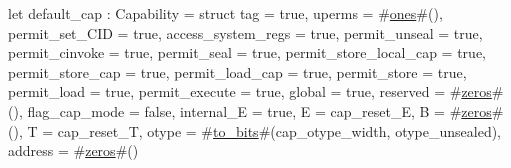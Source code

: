 let default_cap : Capability = struct {
  tag                    = true,
  uperms                 = #\hyperref[sailRISCVzones]{ones}#(),
  permit_set_CID         = true,
  access_system_regs     = true,
  permit_unseal          = true,
  permit_cinvoke         = true,
  permit_seal            = true,
  permit_store_local_cap = true,
  permit_store_cap       = true,
  permit_load_cap        = true,
  permit_store           = true,
  permit_load            = true,
  permit_execute         = true,
  global                 = true,
  reserved               = #\hyperref[sailRISCVzzzeros]{zeros}#(),
  flag_cap_mode          = false,
  internal_E             = true,
  E                      = cap_reset_E,
  B                      = #\hyperref[sailRISCVzzzeros]{zeros}#(),
  T                      = cap_reset_T,
  otype                  = #\hyperref[sailRISCVztozybits]{to\_bits}#(cap_otype_width, otype_unsealed),
  address                = #\hyperref[sailRISCVzzzeros]{zeros}#()
}
